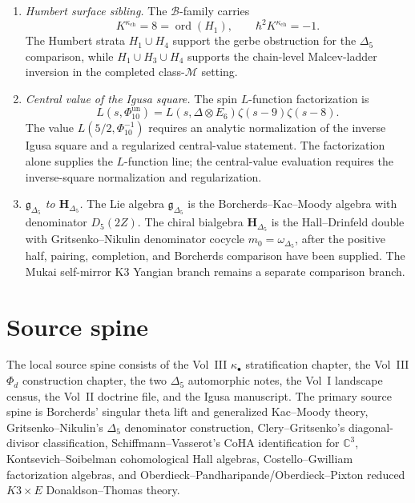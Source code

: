 \documentclass[10pt]{article}
\providecommand{\kch}{\kappa_{\mathrm{ch}}}
\providecommand{\gDelta}{\mathfrak{g}_{\Delta_5}}
\providecommand{\HDelta}{\mathbf{H}_{\Delta_5}}
\begin{document}
\begin{enumerate}
\item \emph{Humbert surface sibling.}
The \(\mathcal B\)-family carries
\[
        K^{\kch}=8=\operatorname{ord}(H_1),\qquad
        \hbar^2 K^{\kch}=-1.
\]
The Humbert strata \(H_1\cup H_4\) support the gerbe obstruction for
the \(\Delta_5\) comparison, while \(H_1\cup H_3\cup H_4\) supports the
chain-level Malcev-ladder inversion in the completed class-\(\mathcal M\)
setting.

\item \emph{Central value of the Igusa square.}
The spin \(L\)-function factorization is
\[
        L(s,\Phi_{10}^{\mathrm{un}})
        =
        L(s,\Delta\otimes E_6)\zeta(s-9)\zeta(s-8).
\]
The value \(L(5/2,\Phi_{10}^{-1})\) requires an analytic normalization
of the inverse Igusa square and a regularized central-value statement.
The factorization alone supplies the \(L\)-function line; the
central-value evaluation requires the inverse-square normalization and
regularization.

\item \emph{\(\gDelta\) to \(\HDelta\).}
The Lie algebra \(\gDelta\) is the Borcherds--Kac--Moody algebra with
denominator \(D_5(2Z)\).  The chiral bialgebra \(\HDelta\) is the
Hall--Drinfeld double with Gritsenko--Nikulin denominator cocycle
\(m_0=\omega_{\Delta_5}\), after the positive half, pairing,
completion, and Borcherds comparison have been supplied.  The Mukai
self-mirror K3 Yangian branch remains a separate comparison branch.
\end{enumerate}

\section*{Source spine}

The local source spine consists of the Vol~III \(\kappa_\bullet\)
stratification chapter, the Vol~III \(\Phi_d\) construction chapter,
the two \(\Delta_5\) automorphic notes, the Vol~I landscape census,
the Vol~II doctrine file, and the Igusa manuscript.
The primary source spine is Borcherds' singular theta lift and
generalized Kac--Moody theory, Gritsenko--Nikulin's \(\Delta_5\)
denominator construction, Clery--Gritsenko's diagonal-divisor
classification, Schiffmann--Vasserot's CoHA identification for
\(\mathbb C^3\), Kontsevich--Soibelman cohomological Hall algebras,
Costello--Gwilliam factorization algebras, and
Oberdieck--Pandharipande/Oberdieck--Pixton reduced \(K3\times E\)
Donaldson--Thomas theory.
\end{document}
